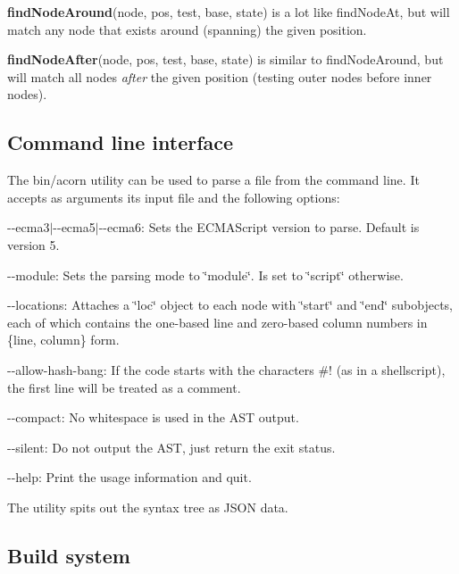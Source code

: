 {\bfseries find\+Node\+Around}{\ttfamily (node, pos, test, base, state)} is a lot like {\ttfamily find\+Node\+At}, but will match any node that exists \textquotesingle{}around\textquotesingle{} (spanning) the given position.

{\bfseries find\+Node\+After}{\ttfamily (node, pos, test, base, state)} is similar to {\ttfamily find\+Node\+Around}, but will match all nodes {\itshape after} the given position (testing outer nodes before inner nodes).

\subsection*{Command line interface}

The {\ttfamily bin/acorn} utility can be used to parse a file from the command line. It accepts as arguments its input file and the following options\+:


\begin{DoxyItemize}
\item {\ttfamily -\/-\/ecma3$\vert$-\/-\/ecma5$\vert$-\/-\/ecma6}\+: Sets the E\+C\+M\+A\+Script version to parse. Default is version 5.
\item {\ttfamily -\/-\/module}\+: Sets the parsing mode to {\ttfamily \char`\"{}module\char`\"{}}. Is set to {\ttfamily \char`\"{}script\char`\"{}} otherwise.
\item {\ttfamily -\/-\/locations}\+: Attaches a \char`\"{}loc\char`\"{} object to each node with \char`\"{}start\char`\"{} and \char`\"{}end\char`\"{} subobjects, each of which contains the one-\/based line and zero-\/based column numbers in {\ttfamily \{line, column\}} form.
\item {\ttfamily -\/-\/allow-\/hash-\/bang}\+: If the code starts with the characters \#! (as in a shellscript), the first line will be treated as a comment.
\item {\ttfamily -\/-\/compact}\+: No whitespace is used in the A\+ST output.
\item {\ttfamily -\/-\/silent}\+: Do not output the A\+ST, just return the exit status.
\item {\ttfamily -\/-\/help}\+: Print the usage information and quit.
\end{DoxyItemize}

The utility spits out the syntax tree as J\+S\+ON data.

\subsection*{Build system}

